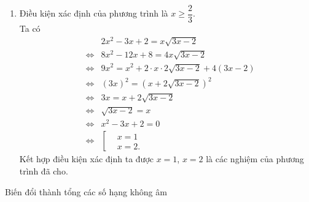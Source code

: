 \begin{vd}
{\begin{enumerate}
\begin{itemize}
				\begin{eqnarray*}
					\sqrt{x-1}-2+3-\sqrt{x-1}=1 \Leftrightarrow \sqrt{x-1}=2 \Leftrightarrow 1=1 ~(\text{luôn đúng với mọi }5\leq x
					< 10).
				\end{eqnarray*}
				\item Nếu $\sqrt{x-1}\geq 3$ thì ta được
				\begin{eqnarray*}
					\sqrt{x-1}-2+\sqrt{x-1}-3=1 \Leftrightarrow \sqrt{x-1}=3 \Leftrightarrow x-1=9 \Leftrightarrow x=10 ~(\text{nhận}).
				\end{eqnarray*}
			\end{itemize}
			Vậy phương trình đã cho có nghiệm $5\leq x \leq 10$.
			\item Điều kiện xác định của phương trình là $x\geq \dfrac{2}{3}$.\\
			Ta có
			\allowdisplaybreaks
			\begin{eqnarray*}
				&& 2x^2-3x+2=x\sqrt{3x-2}\\
				&\Leftrightarrow & 8x^2-12x+8=4x\sqrt{3x-2}\\
				&\Leftrightarrow & 9x^2=x^2+2\cdot x\cdot2\sqrt{3x-2}+4(3x-2)\\
				&\Leftrightarrow & (3x)^2=\left(x+2\sqrt{3x-2}\right)^2\\
				&\Leftrightarrow & 3x=x+2\sqrt{3x-2}\\
				&\Leftrightarrow & \sqrt{3x-2}=x\\
				&\Leftrightarrow & x^2-3x+2=0\\
				&\Leftrightarrow & \left[\begin{aligned}&x=1 \\&x=2.\end{aligned}\right.
			\end{eqnarray*}
			Kết hợp điều kiện xác định ta được $x=1$, $x=2$ là các nghiệm của phương trình đã cho.
		\end{enumerate}
	}
\end{vd}


\begin{dang}{Biến đổi thành tổng các số hạng không âm}
	
\end{dang}


